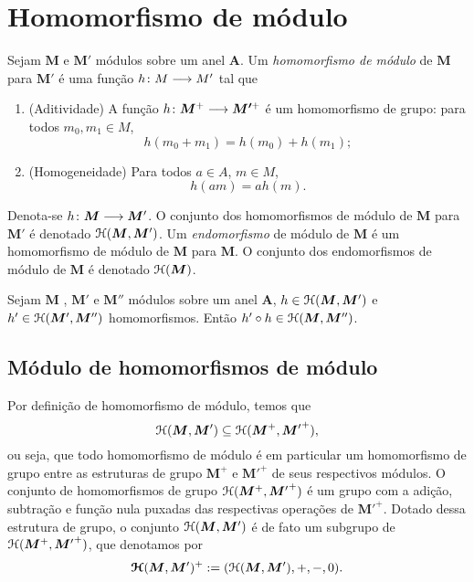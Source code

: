 \section{Homomorfismo de módulo}

\begin{definition}
Sejam $\bm M$ e $\bm M'$ módulos sobre um anel $\bm A$. Um \emph{homomorfismo de módulo} de $\bm M$ para $\bm M'$ é uma função ${h}\colon {M} \longrightarrow {M'}$ tal que
	\begin{enumerate}
	\item (Aditividade) A função ${h}\colon {\bm M^+} \longrightarrow {\bm {M'}^+}$ é um homomorfismo de grupo: para todos $m_0,m_1 \in M$,
		\begin{equation*}
		h(m_0 + m_1) = h(m_0) + h(m_1);
		\end{equation*}

	\item (Homogeneidade) %
	Para todos $a \in A$, $m \in M$,
		\begin{equation*}
		h(a m) = a h(m).
		\end{equation*}
	\end{enumerate}
Denota-se ${h}\colon {\bm M} \longrightarrow {\bm M'}$. O conjunto dos homomorfismos de módulo de $\bm M$ para $\bm M'$ é denotado $\mathcal{H}(\bm M, \bm M')$. Um \emph{endomorfismo} de módulo de $\bm M$ é um homomorfismo de módulo de $\bm M$ para $\bm M$. O conjunto dos endomorfismos de módulo de $\bm M$ é denotado $\mathcal{H}(\bm M)$.
\end{definition}

\begin{exercise}
Sejam $\bm M$ , $\bm M'$ e $\bm M''$ módulos sobre um anel $\bm A$, $h \in \mathcal{H}(\bm M, \bm M')$ e $h' \in \mathcal{H}(\bm M', \bm M'')$ homomorfismos. Então $h' \circ h \in  \mathcal{H}(\bm M, \bm M'')$.
\end{exercise}

\subsection{Módulo de homomorfismos de módulo}

Por definição de homomorfismo de módulo, temos que
	\begin{equation*}
	\mathcal{H}(\bm M,\bm M') \subseteq \mathcal{H}(\bm M^+,{\bm M'}^+),
	\end{equation*}
ou seja, que todo homomorfismo de módulo é em particular um homomorfismo de grupo entre as estruturas de grupo $\bm M^+$ e ${\bm M'}^+$ de seus respectivos módulos. O conjunto de homomorfismos de grupo $\mathcal{H}(\bm M^+,{\bm M'}^+)$ é um grupo com a adição, subtração e função nula puxadas das respectivas operações de ${\bm M'}^+$. Dotado dessa estrutura de grupo, o conjunto $\mathcal{H}(\bm M,\bm M')$ é de fato um subgrupo de $\mathcal{H}(\bm M^+,{\bm M'}^+)$, que denotamos por
	\begin{equation*}
	\bm{\mathcal{H}}(\bm M,\bm M')^+ := (\mathcal{H}(\bm M,\bm M'),+,-,0).
	\end{equation*}

